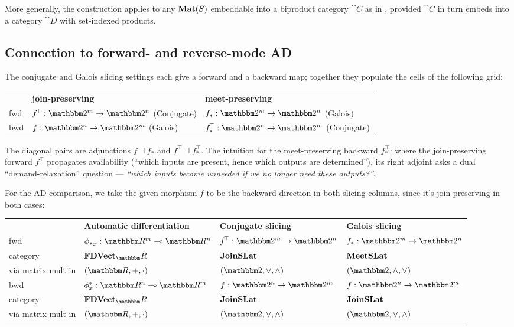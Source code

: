 More generally, the construction applies to any $\mathbf{Mat}(S)$ embeddable into a biproduct category $\cat{C}$ as
in , provided $\cat{C}$ in turn embeds into a category $\cat{D}$ with
set-indexed products.

\subsection{Connection to forward- and reverse-mode AD}
\label{sec:matrix:two:ad}

The conjugate and Galois slicing settings each give a forward and a backward map; together they populate the
cells of the following grid:

\begin{center}
\small
\begin{tabular}{lll}
 & \textbf{join-preserving} & \textbf{meet-preserving} \\
 fwd & $f^{\!\top}: \Two^m \to \Two^n$ \quad (Conjugate) & $f_*: \Two^m \to \Two^n$ \quad (Galois) \\
 bwd & $f: \Two^n \to \Two^m$ \quad (Galois) & $f^{\!\top}_*: \Two^n \to \Two^m$ \quad (Conjugate)
\end{tabular}
\end{center}

\noindent The diagonal pairs are adjunctions $f \dashv f_*$ and $f^{\!\top} \dashv f^{\!\top}_*$. The
intuition for the meet-preserving backward $f^{\!\top}_*$: where the join-preserving forward $f^{\!\top}$
propagates availability (``which inputs are present, hence which outputs are determined''), its right adjoint
asks a dual ``demand-relaxation'' question — \emph{``which inputs become unneeded if we no longer need these
outputs?''}.

For the AD comparison, we take the given morphism $f$ to be the backward direction in both slicing columns,
since it's join-preserving in both cases:

\begin{center}
\vspace{2mm}
\small
\begin{tabular}{llll}
 & \textbf{Automatic differentiation} & \textbf{Conjugate slicing} & \textbf{Galois slicing} \\
 fwd & $\pushf{\phi}_x: \RR^m \linearto \RR^n$ & $f^{\!\top}: \Two^m \to \Two^n$ & $f_*: \Two^m \to \Two^n$ \\
 category & $\FinVect_\RR$ & $\mathbf{JoinSLat}$ & $\mathbf{MeetSLat}$ \\
 via matrix mult in &$(\RR, +, \cdot)$ & $(\Two, \join, \meet)$ & $(\Two, \meet, \join)$ \\[2mm]
 bwd & $\pullf{\phi}_x: \RR^n \linearto \RR^m$ & $f: \Two^n \to \Two^m$ & $f: \Two^n \to \Two^m$ \\
 category & $\FinVect_\RR$ & $\mathbf{JoinSLat}$ & $\mathbf{JoinSLat}$ \\
 via matrix mult in &$(\RR, +, \cdot)$ & $(\Two, \join, \meet)$ & $(\Two, \join, \meet)$
\end{tabular}
\end{center}

